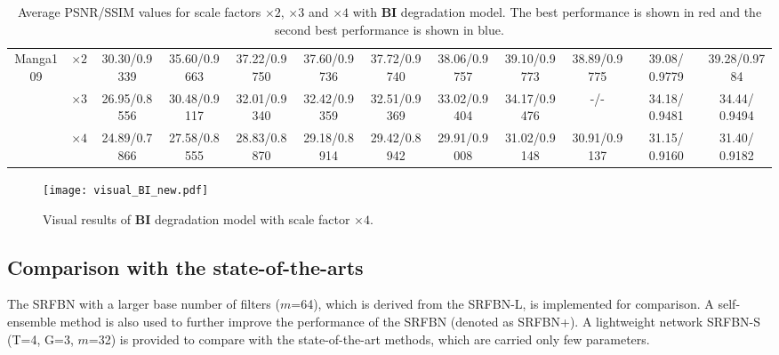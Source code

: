 \documentclass[10pt,twocolumn,letterpaper]{article}
\begin{document}
\begin{table*}[!htbp]
{\begin{tabular}{|c|c|c|c|c|c|c|c||c|c|c|c|}
			\multirow{3}{*}{Manga109} & $\times2$ &  30.30/0.9339            &     35.60/0.9663         &   37.22/0.9750   &    37.60/0.9736      &    37.72/0.9740  & 38.06/0.9757  &   {\color{blue}39.10}/0.9773   &   38.89/0.9775   &  39.08/{\color{blue} 0.9779}    &    {\color{red}39.28}/{\color{red}0.9784}  \\ 
			& $\times3$ &    26.95/0.8556          &      30.48/0.9117        &   32.01/0.9340   &      32.42/0.9359       &   32.51/0.9369  & 33.02/0.9404   &   34.17/0.9476   &  -/-    &   {\color{blue} 34.18}/{\color{blue} 0.9481}   &   {\color{red} 34.44}/{\color{red} 0.9494}    \\ 
			& $\times4$ &    24.89/0.7866          &       27.58/0.8555       &   28.83/0.8870   &      29.18/0.8914    &   29.42/0.8942 & 29.91/0.9008    &   31.02/0.9148   &  30.91/0.9137    &  {\color{blue} 31.15}/{\color{blue} 0.9160}   &   {\color{red} 31.40}/{\color{red} 0.9182}    \\ \hline
	\end{tabular}}
	\smallskip
	\caption{Average PSNR/SSIM values for scale factors $\times 2$, $\times 3$ and $\times 4$ with \textbf{BI} degradation model. The best performance is shown in {\color{red} red} and the second best performance is shown in {\color{blue} blue}.\label{comp_sot_bi}}
	
\end{table*}
	
	\begin{figure}[!htbp]
		\centering
		\texttt{[image: visual\_BI\_new.pdf]}
		\caption{Visual results of \textbf{BI} degradation model with scale factor $\times 4$.}
		\label{visual_BI}
\end{figure}

	\subsection{Comparison with the state-of-the-arts}
	The SRFBN with a larger base number of filters ($m$=64), which is derived from the SRFBN-L, is implemented for comparison. A self-ensemble method\cite{Timofte2016Seven} is also used to further improve the performance of the SRFBN (denoted as SRFBN+). A lightweight network SRFBN-S (T=4, G=3, $m$=32) is provided to compare with the state-of-the-art methods, which are carried only few parameters.
	
\end{document}
